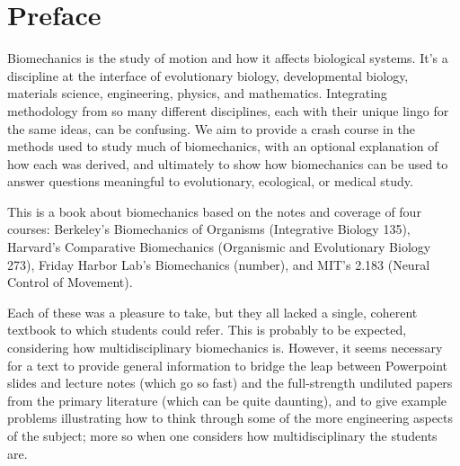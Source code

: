 \chapter*{Preface}

Biomechanics is the study of motion and how it affects biological systems. It's a discipline at the interface of evolutionary biology, developmental biology, materials science, engineering, physics, and mathematics. Integrating methodology from so many different disciplines, each with their unique lingo for the same ideas, can be confusing. We aim to provide a crash course in the methods used to study much of biomechanics, with an optional explanation of how each was derived, and ultimately to show how biomechanics can be used to answer questions meaningful to evolutionary, ecological, or medical study.





This is a book about biomechanics based on the notes and coverage of four courses:  Berkeley's Biomechanics of Organisms (Integrative Biology 135), Harvard's Comparative Biomechanics (Organismic and Evolutionary Biology 273), Friday Harbor Lab's Biomechanics (number), and MIT's 2.183 (Neural Control of Movement).  

Each of these was a pleasure to take, but they all lacked a single, coherent textbook to which students could refer.  This is probably to be expected, considering how multidisciplinary biomechanics is.  However, it seems necessary for a text to provide general information to bridge the leap between Powerpoint slides and lecture notes (which go so fast) and the full-strength undiluted papers from the primary literature (which can be quite daunting), and to give example problems illustrating how to think through some of the more engineering aspects of the subject; more so when one considers how multidisciplinary the students are.

